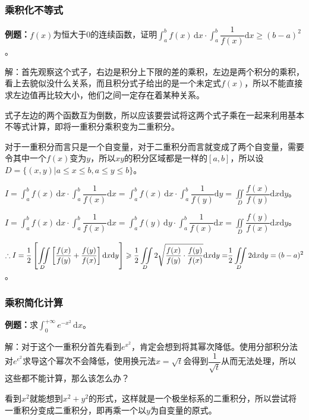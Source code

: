 \documentclass[UTF8, 12pt]{ctexart}
\begin{document}
\subsubsection{乘积化不等式}

\textbf{例题：}$f(x)$为恒大于0的连续函数，证明$\displaystyle{\int_a^bf(x)\,\textrm{d}x\cdot\int_a^b\dfrac{1}{f(x)}\textrm{d}x\geqslant(b-a)^2}$。

解：首先观察这个式子，右边是积分上下限的差的乘积，左边是两个积分的乘积，看上去貌似没什么关系，而且积分式子给出的是一个未定式$f(x)$，所以不能直接求左边值再比较大小，他们之间一定存在着某种关系。

式子左边的两个函数互为倒数，所以应该要尝试将这两个式子乘在一起来利用基本不等式计算，即将一重积分乘积变为二重积分。

对于一重积分而言只是一个自变量，对于二重积分而言就变成了两个自变量，需要令其中一个$f(x)$变为$y$，所以$xy$的积分区域都是一样的$[a,b]$，所以设$D=\{(x,y)\vert a\leqslant x\leqslant b,a\leqslant y\leqslant b\}$。

$I=\displaystyle{\int_a^bf(x)\,\textrm{d}x\cdot\int_a^b\dfrac{1}{f(x)}\textrm{d}x}=\int_a^bf(x)\,\textrm{d}x\cdot\int_a^b\dfrac{1}{f(y)}\textrm{d}y=\iint\limits_D\dfrac{f(x)}{f(y)}\textrm{d}x\textrm{d}y$。

$I=\displaystyle{\int_a^bf(x)\,\textrm{d}x\cdot\int_a^b\dfrac{1}{f(x)}\textrm{d}x}=\int_a^bf(y)\,\textrm{d}y\cdot\int_a^b\dfrac{1}{f(x)}\textrm{d}x=\iint\limits_D\dfrac{f(y)}{f(x)}\textrm{d}x\textrm{d}y$。

$\therefore I=\displaystyle{\dfrac{1}{2}\left[\iint\limits_D\left[\dfrac{f(x)}{f(y)}+\dfrac{f(y)}{f(x)}\right]\textrm{d}x\textrm{d}y\right]\geqslant\dfrac{1}{2}\iint\limits_D2\sqrt{\dfrac{f(x)}{f(y)}\cdot\dfrac{f(y)}{f(x)}}\textrm{d}x\textrm{d}y=}\\\displaystyle{\dfrac{1}{2}\iint\limits_D2\textrm{d}x\textrm{d}y}=(b-a)^2$。

\subsubsection{乘积简化计算}

\textbf{例题：}求$\int_0^{+\infty}e^{-x^2}\,\textrm{d}x$。

解：对于这个一重积分首先看到$e^{x^2}$，肯定会想到将其幂次降低。使用分部积分法对$e^{e^2}$求导这个幂次不会降低，使用换元法$x=\sqrt{t}$会得到$\dfrac{1}{\sqrt{t}}$从而无法处理，所以这些都不能计算，那么该怎么办？

看到$x^2$就能想到$x^2+y^2$的形式，这样就是一个极坐标系的二重积分，所以尝试将一重积分变成二重积分，即再乘一个以$y$为自变量的原式。
\end{document}

